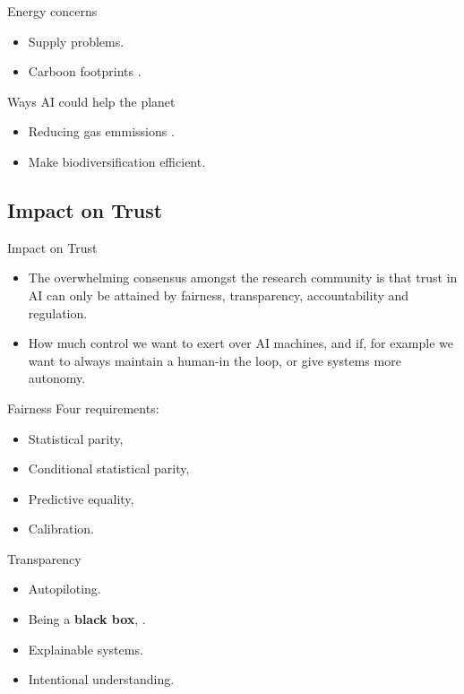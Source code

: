 \documentclass{beamer}
\begin{document}
\begin{frame}{Energy concerns}
\begin{itemize}
    \item Supply problems.
    \item Carboon footprints \citep{strubell2019energy}.
\end{itemize}
\end{frame}

\begin{frame}{Ways AI could help the planet}
\begin{itemize}
    \item Reducing gas emmissions \citep{iglinski2017analysis}.
    \item Make biodiversification efficient.
\end{itemize}
\end{frame}


\subsection{Impact on Trust}

\begin{frame}{Impact on Trust}
\begin{itemize}
    \item The overwhelming consensus amongst the research community is that trust in AI can only be 
attained by fairness, transparency, accountability and regulation.
    \item How much control we want to exert over AI machines, and if, for example we want to always 
maintain a human-in the loop, or give systems more autonomy.
\end{itemize}
\end{frame}



\begin{frame}{Fairness}
Four requirements: \cite{corbett2017algorithmic}
\begin{itemize}
    \item Statistical parity,
    \item Conditional statistical parity,
    \item Predictive equality,
    \item Calibration.
\end{itemize}
\end{frame}

\begin{frame}{Transparency}
\begin{itemize}
    \item Autopiloting.
    \item Being a \textbf{black box}, \cite{kroll2018fallacy}.
    \item Explainable systems.
    \item Intentional understanding.
\end{itemize}
\end{frame}
\end{document}
